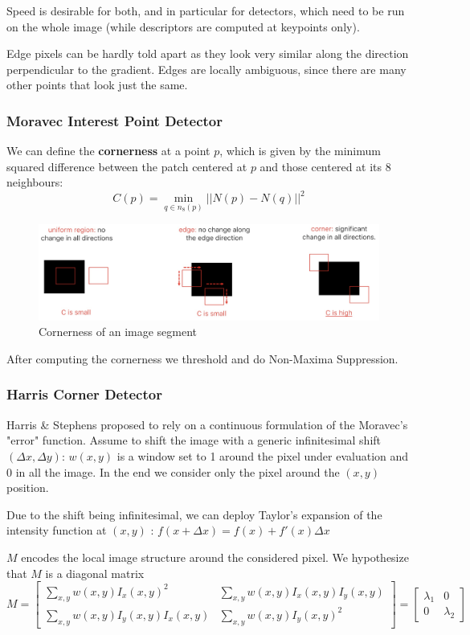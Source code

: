 \documentclass{article}
\begin{document}
Speed is desirable for both, and in particular for detectors, which need to be run on the whole image (while descriptors are computed at keypoints only).

Edge pixels can be hardly told apart as they look very similar along the direction perpendicular to the gradient.
Edges are locally ambiguous, since there are many other points that look just the same.

\subsubsection{Moravec Interest Point Detector}
We can define the \textbf{cornerness} at a point $p$, which is given by the minimum squared difference between the patch centered at $p$ and those centered at its 8 neighbours: 
$$C(p) = \min_{q \in n_8(p)} ||N(p) - N(q)||^2$$

\begin{figure}[htbp]
  \centering
  \includegraphics[width=0.9\linewidth]{./img/cornerness.jpg}
  \caption{Cornerness of an image segment}
  \label{fig:cornerness}
\end{figure}

After computing the cornerness we threshold and do Non-Maxima Suppression.

\subsubsection{Harris Corner Detector}

Harris \& Stephens proposed to rely on a continuous formulation of the Moravec's "error" function.
Assume to shift the image with a generic infinitesimal shift $(\Delta x, \Delta y)$:
$w(x,y)$ is a window set to 1 around the pixel under evaluation and 0 in all the image.
In the end we consider only the pixel around the $(x,y)$ position.

Due to the shift being infinitesimal, we can deploy Taylor's expansion of the intensity function at $(x,y)$ : $f(x + \Delta x) = f(x) + f'(x) \Delta x$

$M$ encodes the local image structure around the considered pixel.
We hypothesize that $M$ is a diagonal matrix
$M =
\begin{bmatrix}
\sum_{x,y} w(x,y) I_x(x,y)^2 & \sum_{x,y} w(x,y) I_x(x,y) I_y(x,y) \\
\sum_{x,y} w(x,y) I_y(x,y) I_x(x,y) & \sum_{x,y} w(x,y) I_y(x,y)^2
\end{bmatrix}
=
\begin{bmatrix}
\lambda_1 & 0 \\
0 & \lambda_2
\end{bmatrix}$
\end{document}
